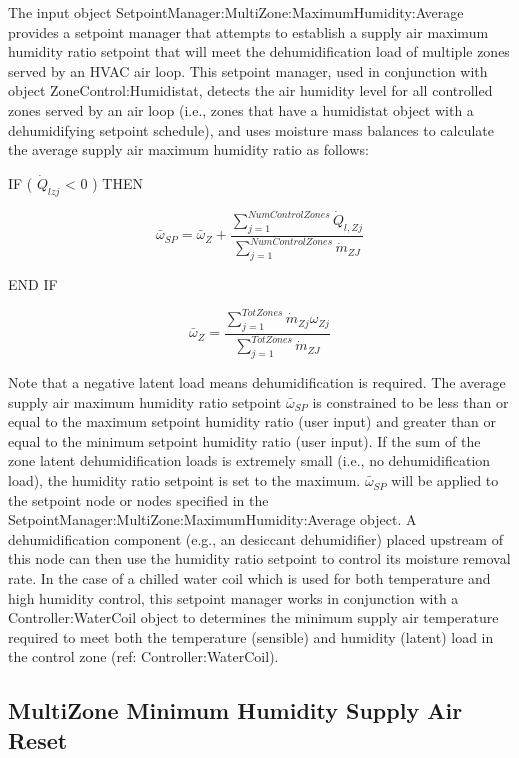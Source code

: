 The input object SetpointManager:MultiZone:MaximumHumidity:Average provides a setpoint manager that attempts to establish a supply air maximum humidity ratio setpoint that will meet the dehumidification load of multiple zones served by an HVAC air loop. This setpoint manager, used in conjunction with object ZoneControl:Humidistat, detects the air humidity level for all controlled zones served by an air loop (i.e., zones that have a humidistat object with a dehumidifying setpoint schedule), and uses moisture mass balances to calculate the average supply air maximum humidity ratio as follows:

IF ( \({\dot Q_{lzj}}\) \textless{} 0 ) THEN

\begin{equation}
  \bar{\omega}_{SP} = \bar{\omega}_Z + \frac{\sum\limits_{j = 1}^{NumControlZones}\dot{Q}_{l,Zj}}{\sum\limits_{j = 1}^{NumControlZones}\dot{m}_{ZJ}}
\end{equation}

END IF

\begin{equation}
  \bar{\omega}_{Z} = \frac{\sum\limits_{j = 1}^{TotZones}\dot{m}_{Zj}\omega_{Zj}}{\sum\limits_{j = 1}^{TotZones}\dot{m}_{ZJ}}
\end{equation}

Note that a negative latent load means dehumidification is required. The average supply air maximum humidity ratio setpoint \({\bar \omega_{SP}}\) is constrained to be less than or equal to the maximum setpoint humidity ratio (user input) and greater than or equal to the minimum setpoint humidity ratio (user input). If the sum of the zone latent dehumidification loads is extremely small (i.e., no dehumidification load), the humidity ratio setpoint is set to the maximum. \({\bar \omega_{SP}}\) will be applied to the setpoint node or nodes specified in the SetpointManager:MultiZone:MaximumHumidity:Average object. A dehumidification component (e.g., an desiccant dehumidifier) placed upstream of this node can then use the humidity ratio setpoint to control its moisture removal rate. In the case of a chilled water coil which is used for both temperature and high humidity control, this setpoint manager works in conjunction with a Controller:WaterCoil object to determines the minimum supply air temperature required to meet both the temperature (sensible) and humidity (latent) load in the control zone (ref: Controller:WaterCoil).

\subsection{MultiZone Minimum Humidity Supply Air Reset}\label{multizone-minimum-humidity-supply-air-reset}

